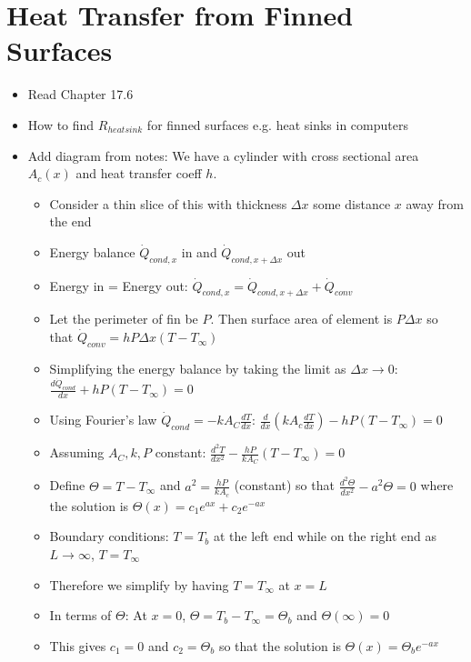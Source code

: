 \documentclass[12pt]{article}
\begin{document}
\section {Heat Transfer from Finned Surfaces }
\begin{itemize}
    \item Read Chapter 17.6
    \item How to find $R_{heat sink}$ for finned surfaces e.g. heat sinks in computers
    \item Add diagram from notes: We have a cylinder with cross sectional area $A_c(x)$ and heat transfer coeff $h$. \begin{itemize}
        \item Consider a thin slice of this with thickness $\Delta x$ some distance $x$ away from the end
        \item Energy balance $\dot{Q}_{cond, x}$ in and $\dot{Q}_{cond, x+\Delta x}$ out
        \item Energy in = Energy out: $\dot{Q}_{cond, x} = \dot{Q}_{cond, x+\Delta x} + \dot{Q}_{conv}$
        \item Let the perimeter of fin be $P$. Then surface area of element is $P \Delta x$ so that $\dot{Q}_{conv} = h P \Delta x (T - T_{\infty})$
        \item Simplifying the energy balance by taking the limit as $\Delta x \rightarrow 0$: $\frac{d \dot{Q}_{cond}}{dx} + hP(T-T_{\infty}) = 0$
        \item Using Fourier's law $\dot{Q}_{cond} = -kA_C \frac{dT}{dx}$: $\frac{d}{dx} (kA_c \frac{dT}{dx}) - hP(T - T_{\infty}) = 0$
        \item Assuming $A_C, k, P$ constant: $\frac{d^2T}{dx^2} - \frac{hP}{kA_C}(T-T_{\infty}) = 0$
        \item Define $\Theta = T - T_{\infty}$ and $a^2 = \frac{hP}{kA_c}$ (constant) so that $\frac{d^2\Theta}{dx^2} - a^2 \Theta = 0$ where the solution is $\Theta(x) = c_1 e^{ax} + c_2 e^{-ax}$
        \item Boundary conditions: $T = T_b$ at the left end while on the right end as $L \rightarrow \infty$, $T = T_{\infty}$
        \item Therefore we simplify by having $T = T_{\infty}$ at $x = L$
        \item In terms of $\Theta$: At $x = 0$, $\Theta = T_b - T_{\infty} = \Theta_b$ and $\Theta (\infty) = 0$ 
        \item This gives $c_1 = 0$ and $c_2 = \Theta_b$ so that the solution is $\Theta(x) = \Theta_b e^{-ax}$ 

\end{itemize}
\end{itemize}
\end{document}
